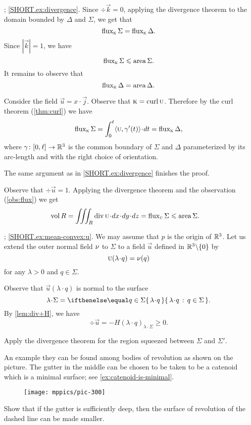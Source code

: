 \parbf{\ref{ex:divergence-1}}; \ref{SHORT.ex:divergence}.
Since $\div\vec k=0$, applying the divergence theorem to the domain bounded by $\Delta$ and $\Sigma$, we get that 
\[\mathop{\rm flux}\nolimits_{\textsc k}\Sigma=\mathop{\rm flux}\nolimits_{\textsc k}\Delta.\]
Since $|\vec k|=1$, we have 
\[\mathop{\rm flux}\nolimits_{\textsc k}\Sigma\leqslant \mathop{\rm area}\nolimits\Sigma.\]
It remains to observe that
\[\mathop{\rm flux}\nolimits_{\textsc k}\Delta=\mathop{\rm area}\nolimits\Delta.\]


 Consider the field $\vec u=x\cdot\vec j$.
Observe that $\textsc k=\mathop{\rm curl}\nolimits \textsc u$.
Therefore by the curl theorem (\ref{thm:curl}) we have 
\[\flux_{\vec k}\Sigma
=
\int_0^\ell\langle\vec u,\gamma'(t)\rangle\cdot dt
=
\flux_{\vec k}\Delta,\]
where $\gamma\colon[0,\ell]\to\mathbb{R}^3$ is the common boundary of $\Sigma$ and $\Delta$ parameterized by its arc-length and with the right choice of orientation.

The same argument as in \ref{SHORT.ex:divergence} finishes the proof.



Observe that $\div\vec u=1$.
Applying the divergence theorem and the observation (\ref{obs:flux}) we get
\begin{align*}
\vol R&=\iiint_R\div\vec u\cdot dx\cdot dy\cdot dz
=
\flux_{\vec u}\Sigma
\le
\area\Sigma.
\end{align*}




\parbf{\ref{ex:mean-convex}}; \ref{SHORT.ex:mean-convex:u}.
We may assume that $p$ is the origin of $\mathbb{R}^3$.
Let us extend the outer normal field $\nu$ to $\Sigma$ to a field $\vec u$ defined in $\mathbb{R}^3\backslash\{0\}$ by
\[\vec u(\lambda\cdot q)=\Norm(q)\]
for any $\lambda>0$ and $q\in\Sigma$.

Observe that $\vec u(\lambda\cdot q)$ is normal to the surface 
\[\lambda\cdot\Sigma=\set{\lambda\cdot q}{q\in\Sigma}.\]
By \ref{lem:div+H}, we have
\[\div \vec u=-H(\lambda\cdot q)_{\lambda\cdot\Sigma}\ge 0.\]

 Apply the divergence theorem for the region squeezed between $\Sigma$ and $\Sigma'$.

An example they can be found among bodies of revolution as shown on the picture.
The gutter in the middle can be chosen to be taken to be a catenoid which is a minimal surface; see \ref{ex:catenoid-is-minimal}.
\begin{figure}[h!]
\vskip-0mm
\centering
\texttt{[image: mppics/pic-300]}
\vskip0mm
\end{figure}
Show that if the gutter is sufficiently deep, then the surface of revolution of the dashed line can be made smaller.


